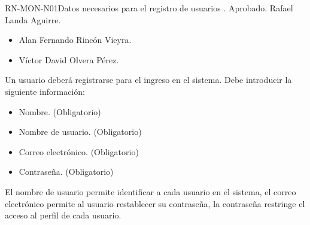 %
\begin{BusinessRule}{RN-MON-N01}{Datos necesarios para el registro de usuarios}
	{\bcIntegridad}
	{\btEnabler}
	{\blControlling}
	.
	\BRItem[Estado] Aprobado.
	 Rafael Landa Aguirre.
	 \cdtEmpty
	\begin{itemize}
		\item Alan Fernando Rincón Vieyra.
		\item Víctor David Olvera Pérez.
	\end{itemize}
	\BRItem[Descripción] Un usuario deberá registrarse para el ingreso en el 
	sistema. Debe introducir la siguiente información:
		\begin{itemize}
			\item Nombre. (Obligatorio)
			\item Nombre de usuario. (Obligatorio)
			\item Correo electrónico. (Obligatorio)
			\item Contraseña. (Obligatorio)
		\end{itemize}
	\BRItem[Motivación] El nombre de usuario permite identificar a cada 
	usuario en el sistema, el correo electrónico permite al usuario 
	restablecer su contraseña, la contraseña restringe el acceso al perfil 
	de cada usuario.
\end{BusinessRule}

